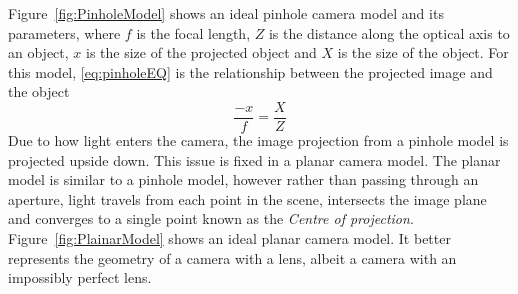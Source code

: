 \documentclass{UoNMCHA}
\numberwithin{equation}{section}
\begin{document}
Figure~\ref{fig:PinholeModel} shows an ideal pinhole camera model and its parameters, where $f$ is the focal length, $Z$ is the distance along the optical axis to an object, $x$ is the size of the projected object and $X$ is the size of the object. For this model, \eqref{eq:pinholeEQ} is the relationship between the projected image and the object
\begin{equation}\label{eq:pinholeEQ}
	\frac{-x}{f} = \frac{X}{Z}
\end{equation}
Due to how light enters the camera, the image projection from a pinhole model is projected upside down. This issue is fixed in a planar camera model. The planar model is similar to a pinhole model, however rather than passing through an aperture, light travels from each point in the scene, intersects the image plane and converges to a single point known as the \textit{Centre of projection}. Figure~\ref{fig:PlainarModel} shows an ideal planar camera model. It better represents the geometry of a camera with a lens, albeit a camera with an impossibly perfect lens.
\end{document}
